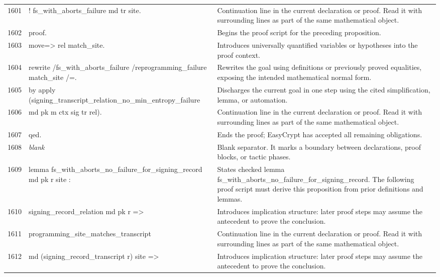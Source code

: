 \documentclass[10pt]{article}
\begin{document}
\begin{longtable}{r L{0.53\textwidth} L{0.37\textwidth}}
1601 & {\ttfamily\scriptsize   ! fs\_with\_aborts\_failure md tr site.} & Continuation line in the current declaration or proof.  Read it with surrounding lines as part of the same mathematical object. \\
1602 & {\ttfamily\scriptsize proof.} & Begins the proof script for the preceding proposition. \\
1603 & {\ttfamily\scriptsize move=> rel match\_site.} & Introduces universally quantified variables or hypotheses into the proof context. \\
1604 & {\ttfamily\scriptsize rewrite /fs\_with\_aborts\_failure /reprogramming\_failure match\_site /=.} & Rewrites the goal using definitions or previously proved equalities, exposing the intended mathematical normal form. \\
1605 & {\ttfamily\scriptsize by apply (signing\_transcript\_relation\_no\_min\_entropy\_failure} & Discharges the current goal in one step using the cited simplification, lemma, or automation. \\
1606 & {\ttfamily\scriptsize             md pk m ctx sig tr rel).} & Continuation line in the current declaration or proof.  Read it with surrounding lines as part of the same mathematical object. \\
1607 & {\ttfamily\scriptsize qed.} & Ends the proof; EasyCrypt has accepted all remaining obligations. \\
1608 & {\ttfamily\scriptsize \emph{blank}} & Blank separator.  It marks a boundary between declarations, proof blocks, or tactic phases. \\
1609 & {\ttfamily\scriptsize lemma fs\_with\_aborts\_no\_failure\_for\_signing\_record md pk r site :} & States checked lemma fs\_with\_aborts\_no\_failure\_for\_signing\_record.  The following proof script must derive this proposition from prior definitions and lemmas. \\
1610 & {\ttfamily\scriptsize   signing\_record\_relation md pk r =>} & Introduces implication structure: later proof steps may assume the antecedent to prove the conclusion. \\
1611 & {\ttfamily\scriptsize   programming\_site\_matches\_transcript} & Continuation line in the current declaration or proof.  Read it with surrounding lines as part of the same mathematical object. \\
1612 & {\ttfamily\scriptsize     md (signing\_record\_transcript r) site =>} & Introduces implication structure: later proof steps may assume the antecedent to prove the conclusion. \\

\end{longtable}
\end{document}
